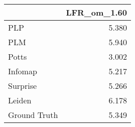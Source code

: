 \begin{tabular}{lr}
\toprule
{} & LFR_om_1.60 \\
\midrule
PLP          &       5.380 \\
PLM          &       5.940 \\
Potts        &       3.002 \\
Infomap      &       5.217 \\
Surprise     &       5.266 \\
Leiden       &       6.178 \\
Ground Truth &       5.349 \\
\bottomrule
\end{tabular}
